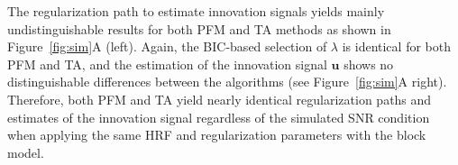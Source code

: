 The regularization path to estimate innovation signals yields mainly undistinguishable results for both PFM and TA methods as shown in Figure~\ref{fig:sim}A (left). Again, the BIC-based selection of \(\lambda\) is identical for both PFM and TA, and the estimation of the innovation signal \(\mathbf{u}\) shows no distinguishable differences between the algorithms (see Figure~\ref{fig:sim}A right). Therefore, both PFM and TA yield nearly identical regularization paths and estimates of the innovation signal regardless of the simulated SNR condition when applying the same HRF and regularization parameters with the block model.


